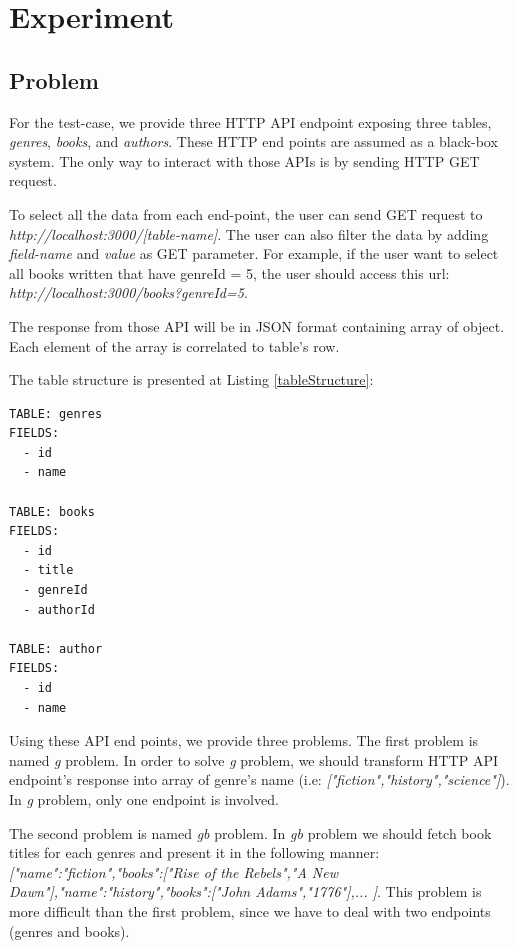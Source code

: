 \documentclass[conference]{IEEEtran}
\begin{document}
\section{Experiment}

\subsection{Problem}

For the test-case, we provide three HTTP API endpoint exposing three tables, {\it genres}, {\it books}, and {\it authors}. These HTTP end points are assumed as a black-box system. The only way to interact with those APIs is by sending HTTP GET request.

To select all the data from each end-point, the user can send GET request to {\it http://localhost:3000/[table-name]}. The user can also filter the data by adding {\it field-name} and {\it value} as GET parameter. For example, if the user want to select all books written that have genreId = 5, the user should access this url: {\it http://localhost:3000/books?genreId=5}.

The response from those API will be in JSON format containing array of object. Each element of the array is correlated to table's row.

The table structure is presented at Listing \ref{tableStructure}:

\begin{lstlisting}[caption=Testcase Table Structure, label=tableStructure, basicstyle=\footnotesize, breaklines=true]
TABLE: genres
FIELDS:
  - id
  - name

TABLE: books
FIELDS:
  - id
  - title
  - genreId
  - authorId

TABLE: author
FIELDS:
  - id
  - name
\end{lstlisting}

Using these API end points, we provide three problems. The first problem is named {\it g} problem. In order to solve {\it g} problem, we should transform HTTP API endpoint's response into array of genre's name (i.e: {\it ["fiction","history","science"]}). In {\it g} problem, only one endpoint is involved.

The second problem is named {\it gb } problem. In {\it gb } problem we should fetch book titles for each genres and present it in the following manner: {\it [{"name":"fiction","books":["Rise of the Rebels","A New Dawn"]},{"name":"history","books":["John Adams","1776"]},... ]}. This problem is more difficult than the first problem, since we have to deal with two endpoints (genres and books).
\end{document}

